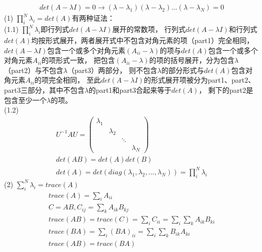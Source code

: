 \subsection{}
\begin{gather}
    det(A-\lambda I)=0
    \rightarrow (\lambda - \lambda_{1})(\lambda - \lambda_{2})...(\lambda - \lambda_{N})=0
\end{gather}
(1) $\prod_{i}^{N} \lambda_{i}=det(A)$有两种证法：\\
(1.1)  $\prod_{i}^{N}\lambda_{i}$即行列式$det(A-\lambda I)$展开的常数项，
行列式$det(A-\lambda I)$和行列式$det(A)$均按形式展开，两者展开式中不包含对角元素的项（part1）完全相同，
$det(A-\lambda I)$包含一个或多个对角元素$(A_{ii}-\lambda)$的项与$det(A)$包含一个或多个对角元素$A_{ii}$的项形式一致，
把包含$(A_{ii}-\lambda)$的项的括号展开，分为包含$\lambda$（part2）与不包含$\lambda$（part3）两部分，
则不包含$\lambda$的部分形式与$det(A)$包含对角元素$A_{ii}$的项完全相同，
至此$det(A-\lambda I)$的形式展开项被分为part1、part2、part3三部分，其中不包含$\lambda$的part1和part3合起来等于$det(A)$，
剩下的part2是包含至少一个$\lambda$的项。\\
(1.2)
\begin{gather}
    U^{-1}AU
    =\begin{pmatrix}
        \lambda_{1} &  &  & \\
         & \lambda_{2} &  & \\
         &  & \ddots & \\
         &  &  & \lambda_{N}
    \end{pmatrix}\\
    det(AB)=det(A)det(B)\\
    det(A)=det(diag(\lambda_{1}, \lambda_{2}, ..., \lambda_{N}))=\prod_{i}^{N} \lambda_{i}
\end{gather}
(2) $\sum_{i}^{N} \lambda_{i}=trace(A)$
\begin{gather}
    trace(A)=\sum_{i}A_{ii}\\
    C=AB, C_{ij}=\sum_{k}A_{ik}B_{kj}\\
    trace(AB)=trace(C)=\sum_{i}C_{ii}=\sum_{i} \sum_{k}A_{ik}B_{ki}\\
    trace(BA)=\sum_{i} (BA)_{ii} = \sum_{i} \sum_{k} B_{ik}A_{ki}\\
    trace(AB)=trace(BA)
\end{gather}
